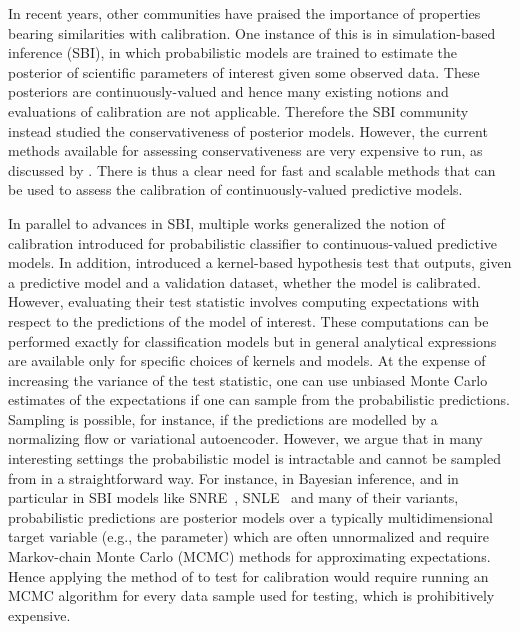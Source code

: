 \documentclass{uai2023} %
\begin{document}
In recent years, other communities have praised the importance of properties bearing similarities with calibration.
One instance of this is in simulation-based inference (SBI), in which probabilistic models are trained to estimate the posterior of scientific parameters of interest given some observed data.
These posteriors are continuously-valued and hence many existing notions and evaluations of calibration are not applicable.
Therefore the SBI community instead studied the conservativeness of posterior models.
However, the current methods available for assessing conservativeness are very expensive to run, as discussed by \citet{Hermans2021}.
There is thus a clear need for fast and scalable methods that can be used to assess the calibration of continuously-valued predictive models.

In parallel to advances in SBI, multiple works \citep[see, e.g.,][]{song2019distribution,widmann2022calibration} generalized the notion of calibration introduced for probabilistic classifier to continuous-valued predictive models.
In addition, \citet{widmann2022calibration} introduced a kernel-based hypothesis test that outputs, given a predictive model and a validation dataset, whether the model is calibrated.
However, evaluating their test statistic involves computing expectations with respect to the predictions of the model of interest.
These computations can be performed exactly for classification models but in general analytical expressions are available only for specific choices of kernels and models.
At the expense of increasing the variance of the test statistic, one can use unbiased Monte Carlo estimates of the expectations if one can sample from the probabilistic predictions.
Sampling is possible, for instance, if the predictions are modelled by a normalizing flow or variational autoencoder.
However, we argue that in many interesting settings the probabilistic model is intractable and cannot be sampled from in a straightforward way.
For instance, in Bayesian inference, and in particular in SBI models like SNRE~\cite{hermans2020likelihood}, SNLE~\cite{papamakarios2019sequential} and many of their variants, probabilistic predictions are posterior models over a typically multidimensional target variable (e.g., the parameter) which are often unnormalized and require Markov-chain Monte Carlo (MCMC) methods for approximating expectations.
Hence applying the method of \citet{widmann2022calibration} to test for calibration would require running an MCMC algorithm for every data sample used for testing, which is prohibitively expensive.
\end{document}
